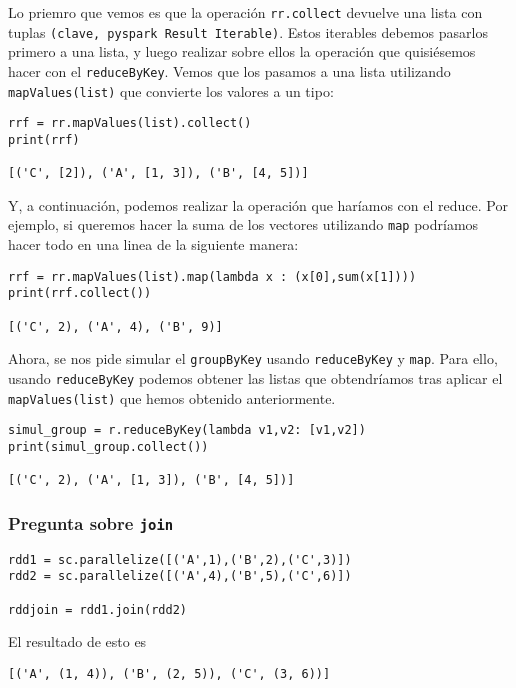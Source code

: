 \documentclass[11pt]{article}
\def\inline{\lstinline[basicstyle=\ttfamily,keywordstyle={}]}
\begin{document}
Lo priemro que vemos es que la operación \inline{rr.collect} devuelve una lista con tuplas \inline{(clave, pyspark Result Iterable)}. Estos iterables debemos pasarlos primero a una lista, y luego realizar sobre ellos la operación que quisiésemos hacer con el \inline{reduceByKey}. Vemos que los pasamos a una lista utilizando \inline{mapValues(list)} que convierte los valores a un tipo:

\begin{verbatim}
rrf = rr.mapValues(list).collect()
print(rrf)

[('C', [2]), ('A', [1, 3]), ('B', [4, 5])]
\end{verbatim}

Y, a continuación, podemos realizar la operación que haríamos con el reduce. Por ejemplo, si queremos hacer la suma de los vectores utilizando \inline{map} podríamos hacer todo en una linea de la siguiente manera:
\begin{verbatim}
rrf = rr.mapValues(list).map(lambda x : (x[0],sum(x[1])))
print(rrf.collect())

[('C', 2), ('A', 4), ('B', 9)]
\end{verbatim}

Ahora, se nos pide simular el \inline{groupByKey} usando \inline{reduceByKey} y \inline{map}. Para ello, usando \inline{reduceByKey} podemos obtener las listas que obtendríamos tras aplicar el \inline{mapValues(list)} que hemos obtenido anteriormente.
\begin{verbatim}
simul_group = r.reduceByKey(lambda v1,v2: [v1,v2])
print(simul_group.collect())

[('C', 2), ('A', [1, 3]), ('B', [4, 5])]
\end{verbatim}

\subsubsection*{ Pregunta sobre \inline{join}}

\begin{verbatim}
rdd1 = sc.parallelize([('A',1),('B',2),('C',3)])
rdd2 = sc.parallelize([('A',4),('B',5),('C',6)])

rddjoin = rdd1.join(rdd2)
\end{verbatim}

El resultado de esto es 
\begin{verbatim}
[('A', (1, 4)), ('B', (2, 5)), ('C', (3, 6))]
\end{verbatim}
\end{document}
